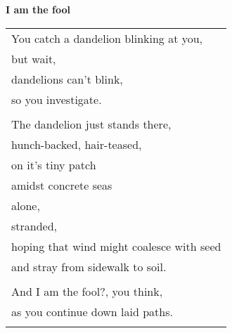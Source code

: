 \documentclass{article}
\begin{document}
\begin{center}
\textbf{I am the fool}\\
\begin{tabular}{l}
\\
You catch a dandelion blinking at you, \\
but wait, \\
dandelions can't blink, \\ %
so you investigate. \\
\\
The dandelion just stands there, \\
hunch-backed, hair-teased, \\
on it's tiny patch \\
amidst concrete seas \\
\hspace*{2em}alone, \\
\hspace*{4em}stranded, \\
hoping that wind might coalesce with seed \\
and stray from sidewalk to soil. \\
\\
And I am the fool?, you think, \\
as you continue down laid paths. \\
\\
%
%
%
\end{tabular}
\end{center}
\end{document}
